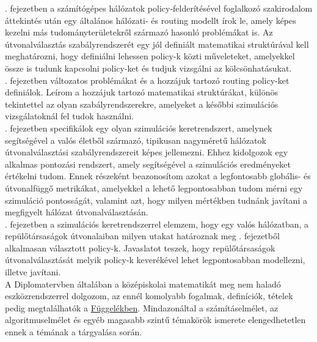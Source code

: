 . fejezetben a számítógépes hálózatok policy-felderítésével foglalkozó szakirodalom áttekintés után egy általános hálózati- és routing modellt írok le, amely képes kezelni más tudományterületekről származó hasonló problémákat is. Az útvonalválasztás szabályrendszerét egy jól definiált matematikai struktúrával kell meghatározni, hogy definiálni lehessen policy-k közti műveleteket, amelyekkel össze is tudunk kapcsolni policy-ket és tudjuk vizsgálni az kölcsönhatásukat.\\

. fejezetben változatos problémákat és a hozzájuk tartozó routing policy-ket definiálok. Leírom a hozzájuk tartozó matematikai struktúrákat, különös tekintettel az olyan szabályrendszerekre, amelyeket a későbbi szimulációs vizsgálatoknál fel tudok használni.\\

. fejezetben specifikálok egy olyan szimulációs keretrendszert, amelynek segítségével a valós életből származó, tipikusan nagyméretű hálózatok útvonalválasztási szabályrendszereit képes jellemezni. Ehhez kidolgozok egy alkalmas pontozási rendszert, amely segítségével a szimulációs eredményeket értékelni tudom. Ennek részeként beazonosítom azokat a legfontosabb globális- és útvonalfüggő metrikákat, amelyekkel a lehető legpontosabban tudom mérni egy szimuláció pontosságát, valamint azt, hogy milyen mértékben tudnánk javítani a megfigyelt hálózat útvonalválasztásán.\\

. fejezetben a szimulációs keretrendszerrel elemzem, hogy egy valós hálózatban, a repülőtársaságok útvonalaiban milyen utakat határoznak meg . fejezetből alkalmasan választott policy-k. Javaslatot teszek, hogy repülőtársaságok útvonalválasztását melyik policy-k keverékével lehet legpontosabban modellezni, illetve javítani.\\

A Diplomatervben általában a középiskolai matematikát meg nem haladó eszközrendszerrel dolgozom, az ennél komolyabb fogalmak, definíciók, tételek pedig megtalálhatók a \hyperlink{appendix}{Függelékben}. Mindazonáltal a számításelmélet, az algoritmuselmélet és egyéb magasabb szintű témakörök ismerete elengedhetetlen ennek a témának a tárgyalása során.
